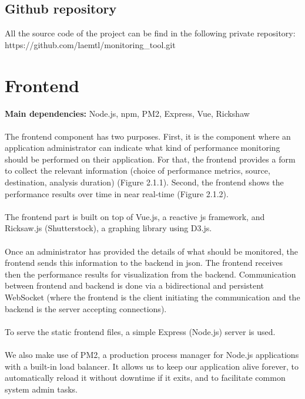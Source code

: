 \documentclass[12pt,hidelinks]{article}
\begin{document}
\subsection{Github repository}
	\vspace{-1.5mm}
	All the source code of the project can be find in the following private repository: \\
	https://github.com/laemtl/monitoring\_tool.git

    

\section{Frontend}
\vspace{7.5cm}

\textbf{Main dependencies:} Node.js, npm, PM2, Express, Vue, Rickshaw \\
\\
The frontend component has two purposes. First, it is the component where an application administrator can indicate what kind of performance monitoring should be performed on their application. 
For that, the frontend provides a form to collect the relevant information (choice of performance metrics, source, destination, analysis duration) (Figure 2.1.1). 
Second, the frontend shows the performance results over time in near real-time (Figure 2.1.2). \\
\\
The frontend part is built on top of Vue.js, a reactive js framework, and Ricksaw.js (Shutterstock), a graphing library using D3.js. \\
\\
Once an administrator has provided the details of what should be monitored, the frontend sends this information to the backend in json. 
The frontend receives then the performance results for visualization from the backend. 
Communication between frontend and backend is done via a bidirectional and persistent WebSocket (where the frontend is the client initiating the communication and the backend is the server accepting connections). \\
\\
To serve the static frontend files, a simple Express (Node.js) server is used. \\
\\
We also make use of PM2, a production process manager for Node.js applications with a built-in load balancer. 
It allows us to keep our application alive forever, to automatically reload it without downtime if it exits, and to facilitate common system admin tasks.
\end{document}
